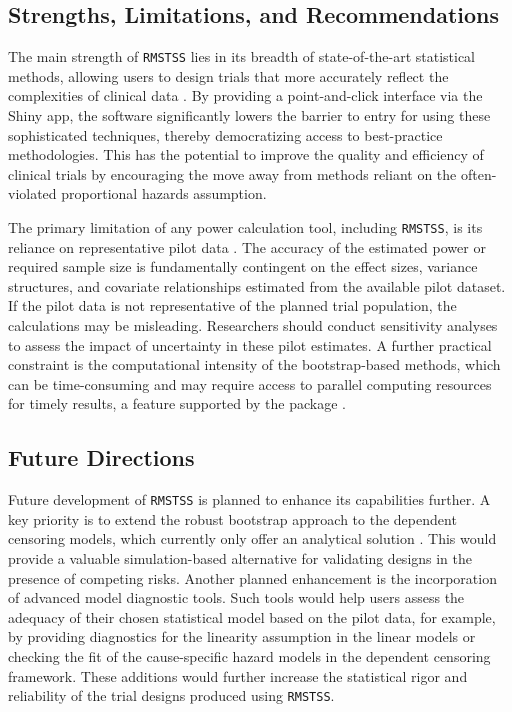 \documentclass[11pt, a4paper]{article}
\begin{document}
\subsection{Strengths, Limitations, and Recommendations}
The main strength of \texttt{RMSTSS} lies in its breadth of state-of-the-art statistical methods, allowing users to design trials that more accurately reflect the complexities of clinical data \cite{[1]}. By providing a point-and-click interface via the Shiny app, the software significantly lowers the barrier to entry for using these sophisticated techniques, thereby democratizing access to best-practice methodologies. This has the potential to improve the quality and efficiency of clinical trials by encouraging the move away from methods reliant on the often-violated proportional hazards assumption.

The primary limitation of any power calculation tool, including \texttt{RMSTSS}, is its reliance on representative pilot data \cite{[1]}. The accuracy of the estimated power or required sample size is fundamentally contingent on the effect sizes, variance structures, and covariate relationships estimated from the available pilot dataset. If the pilot data is not representative of the planned trial population, the calculations may be misleading. Researchers should conduct sensitivity analyses to assess the impact of uncertainty in these pilot estimates. A further practical constraint is the computational intensity of the bootstrap-based methods, which can be time-consuming and may require access to parallel computing resources for timely results, a feature supported by the package \cite{[1]}.

\subsection{Future Directions}
Future development of \texttt{RMSTSS} is planned to enhance its capabilities further. A key priority is to extend the robust bootstrap approach to the dependent censoring models, which currently only offer an analytical solution \cite{[1]}. This would provide a valuable simulation-based alternative for validating designs in the presence of competing risks. Another planned enhancement is the incorporation of advanced model diagnostic tools. Such tools would help users assess the adequacy of their chosen statistical model based on the pilot data, for example, by providing diagnostics for the linearity assumption in the linear models or checking the fit of the cause-specific hazard models in the dependent censoring framework. These additions would further increase the statistical rigor and reliability of the trial designs produced using \texttt{RMSTSS}.
\end{document}
